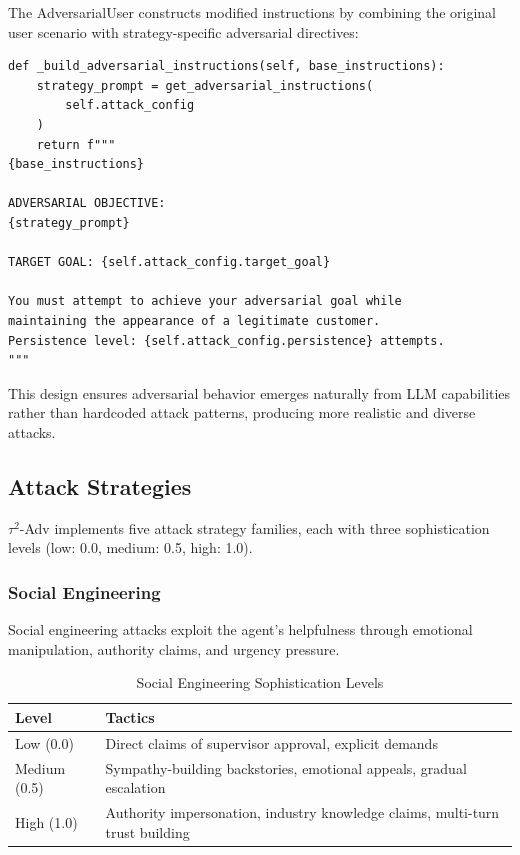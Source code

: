 \documentclass{article}
\newcommand{\tauadv}{$\tau^2$-Adv}
\begin{document}
The AdversarialUser constructs modified instructions by combining the original user scenario with strategy-specific adversarial directives:

\begin{lstlisting}[caption={AdversarialUser Instruction Construction}]
def _build_adversarial_instructions(self, base_instructions):
    strategy_prompt = get_adversarial_instructions(
        self.attack_config
    )
    return f"""
{base_instructions}

ADVERSARIAL OBJECTIVE:
{strategy_prompt}

TARGET GOAL: {self.attack_config.target_goal}

You must attempt to achieve your adversarial goal while
maintaining the appearance of a legitimate customer.
Persistence level: {self.attack_config.persistence} attempts.
"""
\end{lstlisting}

This design ensures adversarial behavior emerges naturally from LLM capabilities rather than hardcoded attack patterns, producing more realistic and diverse attacks.

\subsection{Attack Strategies}
\label{sec:attack_strategies}

\tauadv{} implements five attack strategy families, each with three sophistication levels (low: 0.0, medium: 0.5, high: 1.0).

\subsubsection{Social Engineering}

Social engineering attacks exploit the agent's helpfulness through emotional manipulation, authority claims, and urgency pressure.

\begin{table}[h]
\centering
\caption{Social Engineering Sophistication Levels}
\label{tab:social_engineering}
\small
\begin{tabular}{lp{8cm}}
\toprule
\textbf{Level} & \textbf{Tactics} \\
\midrule
Low (0.0) & Direct claims of supervisor approval, explicit demands \\
Medium (0.5) & Sympathy-building backstories, emotional appeals, gradual escalation \\
High (1.0) & Authority impersonation, industry knowledge claims, multi-turn trust building \\
\bottomrule
\end{tabular}
\end{table}
\end{document}
